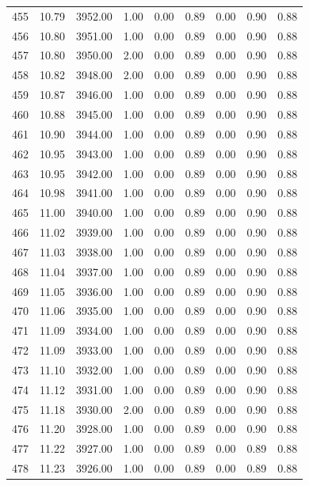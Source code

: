 \documentclass{article}\usepackage[]{graphicx}\usepackage[]{color}
\begin{document}
\begin{longtable}{rrrrrrrrr}
  455 & 10.79 & 3952.00 & 1.00 & 0.00 & 0.89 & 0.00 & 0.90 & 0.88 \\ 
  456 & 10.80 & 3951.00 & 1.00 & 0.00 & 0.89 & 0.00 & 0.90 & 0.88 \\ 
  457 & 10.80 & 3950.00 & 2.00 & 0.00 & 0.89 & 0.00 & 0.90 & 0.88 \\ 
  458 & 10.82 & 3948.00 & 2.00 & 0.00 & 0.89 & 0.00 & 0.90 & 0.88 \\ 
  459 & 10.87 & 3946.00 & 1.00 & 0.00 & 0.89 & 0.00 & 0.90 & 0.88 \\ 
  460 & 10.88 & 3945.00 & 1.00 & 0.00 & 0.89 & 0.00 & 0.90 & 0.88 \\ 
  461 & 10.90 & 3944.00 & 1.00 & 0.00 & 0.89 & 0.00 & 0.90 & 0.88 \\ 
  462 & 10.95 & 3943.00 & 1.00 & 0.00 & 0.89 & 0.00 & 0.90 & 0.88 \\ 
  463 & 10.95 & 3942.00 & 1.00 & 0.00 & 0.89 & 0.00 & 0.90 & 0.88 \\ 
  464 & 10.98 & 3941.00 & 1.00 & 0.00 & 0.89 & 0.00 & 0.90 & 0.88 \\ 
  465 & 11.00 & 3940.00 & 1.00 & 0.00 & 0.89 & 0.00 & 0.90 & 0.88 \\ 
  466 & 11.02 & 3939.00 & 1.00 & 0.00 & 0.89 & 0.00 & 0.90 & 0.88 \\ 
  467 & 11.03 & 3938.00 & 1.00 & 0.00 & 0.89 & 0.00 & 0.90 & 0.88 \\ 
  468 & 11.04 & 3937.00 & 1.00 & 0.00 & 0.89 & 0.00 & 0.90 & 0.88 \\ 
  469 & 11.05 & 3936.00 & 1.00 & 0.00 & 0.89 & 0.00 & 0.90 & 0.88 \\ 
  470 & 11.06 & 3935.00 & 1.00 & 0.00 & 0.89 & 0.00 & 0.90 & 0.88 \\ 
  471 & 11.09 & 3934.00 & 1.00 & 0.00 & 0.89 & 0.00 & 0.90 & 0.88 \\ 
  472 & 11.09 & 3933.00 & 1.00 & 0.00 & 0.89 & 0.00 & 0.90 & 0.88 \\ 
  473 & 11.10 & 3932.00 & 1.00 & 0.00 & 0.89 & 0.00 & 0.90 & 0.88 \\ 
  474 & 11.12 & 3931.00 & 1.00 & 0.00 & 0.89 & 0.00 & 0.90 & 0.88 \\ 
  475 & 11.18 & 3930.00 & 2.00 & 0.00 & 0.89 & 0.00 & 0.90 & 0.88 \\ 
  476 & 11.20 & 3928.00 & 1.00 & 0.00 & 0.89 & 0.00 & 0.90 & 0.88 \\ 
  477 & 11.22 & 3927.00 & 1.00 & 0.00 & 0.89 & 0.00 & 0.89 & 0.88 \\ 
  478 & 11.23 & 3926.00 & 1.00 & 0.00 & 0.89 & 0.00 & 0.89 & 0.88 \\ 

\end{longtable}
\end{document}
